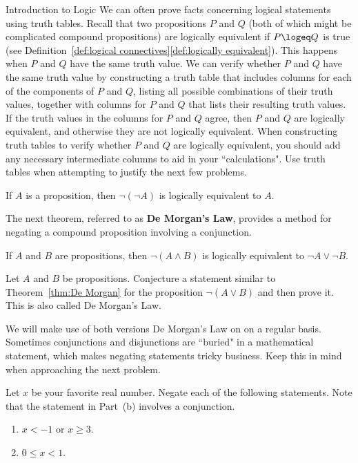 \begin{section}{Introduction to Logic}
We can often prove facts concerning logical statements using truth tables.  Recall that two propositions $P$ and $Q$ (both of which might be complicated compound propositions) are logically equivalent if $P\logeq Q$ is true (see Definition~\ref{def:logical connectives}\ref{def:logically equivalent}). This happens when $P$ and $Q$ have the same truth value. We can verify whether $P$ and $Q$ have the same truth value by constructing a truth table that includes columns for each of the components of $P$ and $Q$, listing all possible combinations of their truth values, together with columns for $P$ and $Q$ that lists their resulting truth values.  If the truth values in the columns for $P$ and $Q$ agree, then $P$ and $Q$ are logically equivalent, and otherwise they are not logically equivalent.  When constructing truth tables to verify whether $P$ and $Q$ are logically equivalent, you should add any necessary intermediate columns to aid in your ``calculations". Use truth tables when attempting to justify the next few problems.

\begin{theorem}
If $A$ is a proposition, then $\neg(\neg A)$ is logically equivalent to $A$.
\end{theorem}

The next theorem, referred to as \textbf{De Morgan's Law}, provides a method for negating a compound proposition involving a conjunction.

\begin{theorem}\label{thm:De Morgan}
If $A$ and $B$ are propositions, then $\neg(A \wedge B)$ is logically equivalent to $\neg A \vee \neg B$.
\end{theorem}

\begin{problem}\label{prob:De Morgan}
Let $A$ and $B$ be propositions.  Conjecture a statement similar to Theorem~\ref{thm:De Morgan} for the proposition $\neg(A\vee B)$ and then prove it. This is also called De Morgan's Law.
\end{problem}

We will make use of both versions De Morgan's Law on on a regular basis. Sometimes conjunctions and disjunctions are ``buried" in a mathematical statement, which makes negating statements tricky business. Keep this in mind when approaching the next problem.

\begin{problem}\label{prob:negation}
Let $x$ be your favorite real number.  Negate each of the following statements.  Note that the statement in Part~(b) involves a conjunction.
\begin{enumerate}[label=\textrm{(\alph*)}]
\item $x<-1$ or $x\geq 3$.
\item $0\leq x< 1$.
\end{enumerate}
\end{problem}


\end{section}
